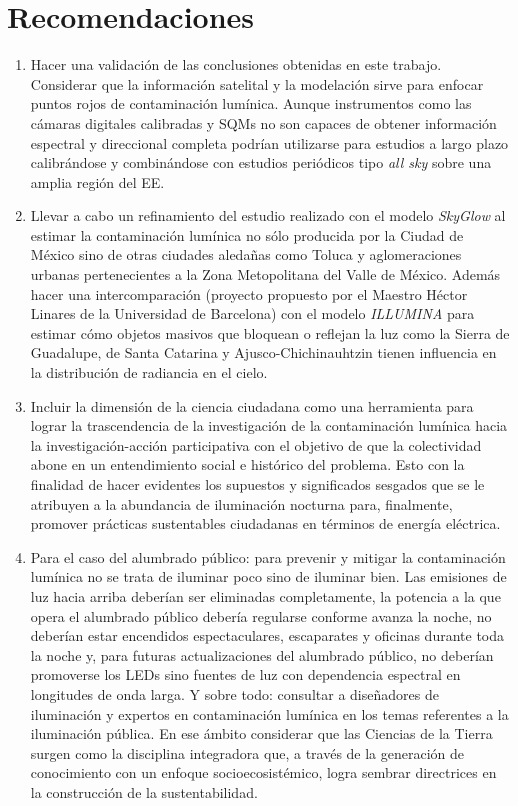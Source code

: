 \chapter{Recomendaciones}
\label{chap:recomendaciones}


\begin{enumerate}[I]

\item Hacer una validación de las conclusiones obtenidas en este trabajo. Considerar que la información satelital y la modelación sirve para enfocar puntos rojos de contaminación lumínica. Aunque instrumentos como las cámaras digitales calibradas y SQMs no son capaces de obtener información espectral y direccional completa podrían utilizarse para estudios a largo plazo calibrándose y combinándose con estudios periódicos tipo \textit{all sky} sobre una amplia región del EE.

\item Llevar a cabo un refinamiento del estudio realizado con el modelo \textit{SkyGlow} al estimar la contaminación lumínica no sólo producida por la Ciudad de México sino de otras ciudades aledañas como Toluca y aglomeraciones urbanas pertenecientes a la Zona Metopolitana del Valle de México. Además hacer una intercomparación (proyecto propuesto por el Maestro Héctor Linares de la Universidad de Barcelona) con el modelo \textit{ILLUMINA} para estimar cómo objetos masivos que bloquean o reflejan la luz como la Sierra de Guadalupe, de Santa Catarina y Ajusco-Chichinauhtzin tienen influencia en la distribución de radiancia en el cielo.

\item Incluir la dimensión de la ciencia ciudadana como una herramienta para lograr la trascendencia de la investigación de la contaminación lumínica hacia la investigación-acción participativa con el objetivo de que la colectividad abone en un entendimiento social e histórico del problema. Esto con la finalidad de hacer evidentes los supuestos y significados sesgados que se le atribuyen a la abundancia de iluminación nocturna para, finalmente, promover prácticas sustentables ciudadanas en términos de energía eléctrica. 

\item Para el caso del alumbrado público: para prevenir y mitigar la contaminación lumínica no se trata de iluminar poco sino de iluminar bien. Las emisiones de luz hacia arriba deberían ser eliminadas completamente, la potencia a la que opera el alumbrado público debería regularse conforme avanza la noche, no deberían estar encendidos espectaculares, escaparates y oficinas durante toda la noche y, para futuras actualizaciones del alumbrado público, no deberían promoverse los LEDs sino fuentes de luz con dependencia espectral en longitudes de onda larga. Y sobre todo: consultar a diseñadores de iluminación y expertos en contaminación lumínica en los temas referentes a la iluminación pública. En ese ámbito considerar que las Ciencias de la Tierra surgen como la disciplina integradora que, a través de la generación de conocimiento con un enfoque socioecosistémico, logra sembrar directrices en la construcción de la sustentabilidad.


\end{enumerate}
